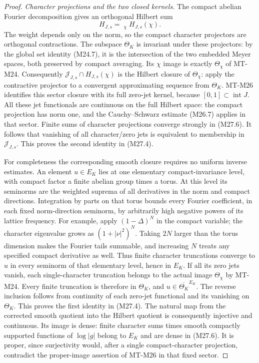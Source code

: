\begin{proof}
\emph{Character projections and the two closed kernels.}
The compact abelian Fourier decomposition gives an
orthogonal Hilbert sum
\[
                     H_{J,s}=\mathop{\widehat\bigoplus}_\chi
                                      H_{J,s}(\chi).
                                                               \tag{M27.6}
\]
The weight depends only on the norm, so the compact
character projectors are orthogonal contractions.
The subspace $\Theta_K$ is invariant under these
projectors: by the global set identity (M24.7), it is
the intersection of the two embedded Meyer spaces,
both preserved by compact averaging. Its $\chi$ image
is exactly $\Theta_\chi$ of MT-M24.
Consequently $\mathcal J_{J,s}\cap H_{J,s}(\chi)$ is
the Hilbert closure of $\Theta_\chi$: apply the
contractive projector to a convergent approximating
sequence from $\Theta_K$. MT-M26 identifies this sector
closure with its full zero-jet kernel, because
$[0,1]\subset\operatorname{int}J$.
All these jet functionals are continuous on the full
Hilbert space: the compact projection has norm one,
and the Cauchy--Schwarz estimate (M26.7) applies in
that sector. Finite sums of character projections
converge strongly in (M27.6). It follows that vanishing
of all character/zero jets is equivalent to membership
in $\mathcal J_{J,s}$. This proves the second identity
in (M27.4).

For completeness the corresponding smooth closure
requires no uniform inverse estimates. An element
$u\in E_K$ lies at one elementary compact-invariance
level, with compact factor a finite abelian group
times a torus. At this level its seminorms are the
weighted suprema of all derivatives in the norm and
compact directions. Integration by parts on that
torus bounds every Fourier coefficient, in each
fixed norm-direction seminorm, by arbitrarily high
negative powers of its lattice frequency. For
example, apply $(1-\Delta)^N$ in the compact variable;
the character eigenvalue grows as $(1+|\nu|^2)^N$.
Taking $2N$ larger than the torus dimension makes
the Fourier tails summable, and increasing $N$
treats any specified compact derivative as well.
Thus finite character truncations converge to $u$
in every seminorm of that elementary level, hence
in $E_K$.
If all its zero jets vanish, each single-character
truncation belongs to the actual image $\Theta_\chi$
by MT-M24. Every finite truncation is therefore in
$\Theta_K$, and $u\in\overline{\Theta_K}^{E_K}$.
The reverse inclusion follows from continuity of
each zero-jet functional and its vanishing on
$\Theta_K$. This proves the first identity in
(M27.4). The natural map from the corrected smooth
quotient into the Hilbert quotient is consequently
injective and continuous. Its image is dense:
finite character sums times smooth compactly
supported functions of $\log|g|$ belong to $E_K$
and are dense in (M27.6). It is proper, since
surjectivity would, after a single compact-character
projection, contradict the proper-image assertion
of MT-M26 in that fixed sector.


\end{proof}
